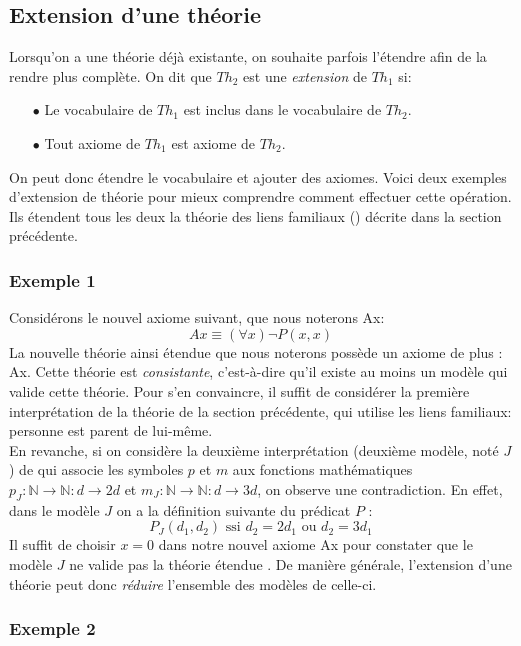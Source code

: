 {\subsection{Extension d'une théorie}
Lorsqu'on a une théorie déjà existante, on souhaite parfois l'étendre afin de la rendre plus complète.
On dit que $Th_2$ est une {\em extension} de $Th_1$ si:
\begin{itemize}
\item[$\bullet$] Le vocabulaire de $Th_1$ est inclus dans le vocabulaire de $Th_2$.
\item[$\bullet$] Tout axiome de $Th_1$ est axiome de $Th_2$.
\end{itemize}
On peut donc étendre le vocabulaire et ajouter des axiomes.
Voici deux exemples d'extension de théorie pour mieux comprendre comment effectuer cette opération. Ils étendent tous les deux
la théorie des liens familiaux () décrite dans la section précédente.

\subsubsection{Exemple 1}

Considérons le nouvel axiome suivant, que nous noterons Ax:
$$ Ax \equiv (\forall x) \neg P(x,x) $$
La nouvelle théorie ainsi étendue que nous noterons  possède un axiome de plus : Ax. Cette théorie 
est {\em consistante}, c'est-à-dire qu'il existe au moins un modèle qui valide cette théorie.
Pour s'en convaincre, il suffit de considérer la première interprétation de la théorie  de la section précédente,
qui utilise les liens familiaux: personne est parent de lui-même.\\

En revanche, si on considère la deuxième interprétation (deuxième modèle, noté $J$) de 
qui associe les symboles $p$ et $m$ aux fonctions mathématiques $p_J : \mathbb{N} \rightarrow \mathbb{N} : d \rightarrow 2d$ et $m_J : \mathbb{N} \rightarrow \mathbb{N} : d \rightarrow 3d$, on observe une contradiction.
En effet, dans le modèle $J$ on a la définition suivante du prédicat $P$ :
$$ P_J(d_1, d_2) \textrm{ ssi } d_2 = 2d_1 \textrm{ ou } d_2 = 3d_1$$
Il suffit de choisir $x=0$ dans notre nouvel axiome Ax pour constater que le modèle $J$ ne valide pas la théorie étendue .
De manière générale, l'extension d'une théorie peut donc {\em réduire} l'ensemble des modèles de celle-ci.

\subsubsection{Exemple 2}

}
